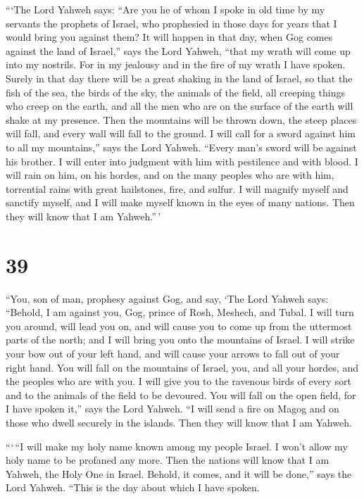  ```The Lord Yahweh says: ``Are you he of whom I spoke in
old time by my servants the prophets of Israel, who prophesied in those
days for years that I would bring you against them?  It
will happen in that day, when Gog comes against the land of Israel,''
says the Lord Yahweh, ``that my wrath will come up into my nostrils.
 For in my jealousy and in the fire of my wrath I have
spoken. Surely in that day there will be a great shaking in the land of
Israel,  so that the fish of the sea, the birds of the sky,
the animals of the field, all creeping things who creep on the earth,
and all the men who are on the surface of the earth will shake at my
presence. Then the mountains will be thrown down, the steep places will
fall, and every wall will fall to the ground.  I will call
for a sword against him to all my mountains,'' says the Lord Yahweh.
``Every man's sword will be against his brother.  I will
enter into judgment with him with pestilence and with blood. I will rain
on him, on his hordes, and on the many peoples who are with him,
torrential rains with great hailstones, fire, and sulfur. 
I will magnify myself and sanctify myself, and I will make myself known
in the eyes of many nations. Then they will know that I am Yahweh.''\,'

\hypertarget{section-37}{%
\section{39}\label{section-37}}

 ``You, son of man, prophesy against Gog, and say, `The Lord
Yahweh says: ``Behold, I am against you, Gog, prince of Rosh, Meshech,
and Tubal.  I will turn you around, will lead you on, and
will cause you to come up from the uttermost parts of the north; and I
will bring you onto the mountains of Israel.  I will strike
your bow out of your left hand, and will cause your arrows to fall out
of your right hand.  You will fall on the mountains of
Israel, you, and all your hordes, and the peoples who are with you. I
will give you to the ravenous birds of every sort and to the animals of
the field to be devoured.  You will fall on the open field,
for I have spoken it,'' says the Lord Yahweh.  ``I will send
a fire on Magog and on those who dwell securely in the islands. Then
they will know that I am Yahweh.

 ```\,``I will make my holy name known among my people
Israel. I won't allow my holy name to be profaned any more. Then the
nations will know that I am Yahweh, the Holy One in Israel. 
Behold, it comes, and it will be done,'' says the Lord Yahweh. ``This is
the day about which I have spoken.

